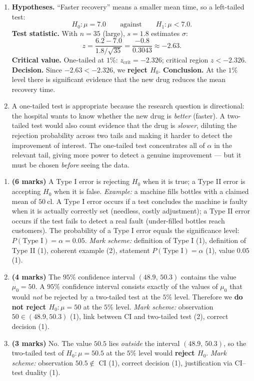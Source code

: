 \documentclass[11pt]{article}
\begin{document}
\begin{corrige}
\begin{enumerate}
\item \textbf{Hypotheses.} ``Faster recovery'' means a smaller mean time, so a left-tailed test:
\[ H_0:\mu=7.0\qquad\text{against}\qquad H_1:\mu<7.0. \]
\textbf{Test statistic.} With $n=35$ (large), $s=1.8$ estimates $\sigma$:
\[ z=\frac{6.2-7.0}{1.8/\sqrt{35}}=\frac{-0.8}{0.3043}\approx -2.63. \]
\textbf{Critical value.} One-tailed at $1\%$: $z_{\text{crit}}=-2.326$; critical region $z<-2.326$.
\textbf{Decision.} Since $-2.63<-2.326$, we \textbf{reject $H_0$}.
\textbf{Conclusion.} At the $1\%$ level there is significant evidence that the new drug reduces the mean recovery time.
\item A one-tailed test is appropriate because the research question is directional: the hospital wants to know whether the new drug is \emph{better} (faster). A two-tailed test would also count evidence that the drug is \emph{slower}, diluting the rejection probability across two tails and making it harder to detect the improvement of interest. The one-tailed test concentrates all of $\alpha$ in the relevant tail, giving more power to detect a genuine improvement --- but it must be chosen \emph{before} seeing the data.
\end{enumerate}
\end{corrige}

\begin{corrige}
\begin{enumerate}
\item \textbf{(6 marks)} A Type I error is rejecting $H_0$ when it is true; a Type II error is accepting $H_0$ when it is false. \emph{Example:} a machine fills bottles with a claimed mean of $50\ \mathrm{cl}$. A Type I error occurs if a test concludes the machine is faulty when it is actually correctly set (needless, costly adjustment); a Type II error occurs if the test fails to detect a real fault (under-filled bottles reach customers). The probability of a Type I error equals the significance level: $P(\text{Type I})=\alpha=0.05$. \emph{Mark scheme:} definition of Type I (1), definition of Type II (1), coherent example (2), statement $P(\text{Type I})=\alpha$ (1), value $0.05$ (1).
\item \textbf{(4 marks)} The $95\%$ confidence interval $(48.9,\,50.3)$ contains the value $\mu_0=50$. A $95\%$ confidence interval consists exactly of the values of $\mu_0$ that would \emph{not} be rejected by a two-tailed test at the $5\%$ level. Therefore we \textbf{do not reject $H_0:\mu=50$} at the $5\%$ level. \emph{Mark scheme:} observation $50\in(48.9,50.3)$ (1), link between CI and two-tailed test (2), correct decision (1).
\item \textbf{(3 marks)} No. The value $50.5$ lies \emph{outside} the interval $(48.9,\,50.3)$, so the two-tailed test of $H_0:\mu=50.5$ at the $5\%$ level would \textbf{reject $H_0$}. \emph{Mark scheme:} observation $50.5\notin$ CI (1), correct decision (1), justification via CI--test duality (1).
\end{enumerate}
\end{corrige}
\end{document}
